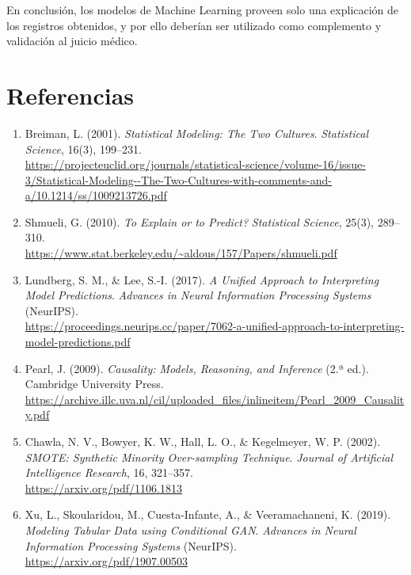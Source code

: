 \documentclass[11pt]{article}
\begin{document}
En conclusión, los modelos de Machine Learning proveen solo una explicación de los registros obtenidos, y por ello deberían ser utilizado como complemento y validación al juicio médico.
\clearpage

\section*{Referencias}
\sloppy
\begin{enumerate}

  \item Breiman, L. (2001). \textit{Statistical Modeling: The Two Cultures}. \textit{Statistical Science}, 16(3), 199--231.\\
  \url{https://projecteuclid.org/journals/statistical-science/volume-16/issue-3/Statistical-Modeling--The-Two-Cultures-with-comments-and-a/10.1214/ss/1009213726.pdf}

  \item Shmueli, G. (2010). \textit{To Explain or to Predict?} \textit{Statistical Science}, 25(3), 289--310.\\
  \url{https://www.stat.berkeley.edu/~aldous/157/Papers/shmueli.pdf}

  \item Lundberg, S. M., \& Lee, S.-I. (2017). \textit{A Unified Approach to Interpreting Model Predictions}. \textit{Advances in Neural Information Processing Systems} (NeurIPS).\\
  \url{https://proceedings.neurips.cc/paper/7062-a-unified-approach-to-interpreting-model-predictions.pdf}

  \item Pearl, J. (2009). \textit{Causality: Models, Reasoning, and Inference} (2.ª ed.). Cambridge University Press.\\
  \url{https://archive.illc.uva.nl/cil/uploaded_files/inlineitem/Pearl_2009_Causality.pdf}

  \item Chawla, N. V., Bowyer, K. W., Hall, L. O., \& Kegelmeyer, W. P. (2002). \textit{SMOTE: Synthetic Minority Over-sampling Technique}. \textit{Journal of Artificial Intelligence Research}, 16, 321--357.\\
  \url{https://arxiv.org/pdf/1106.1813}

  \item Xu, L., Skoularidou, M., Cuesta-Infante, A., \& Veeramachaneni, K. (2019). \textit{Modeling Tabular Data using Conditional GAN}. \textit{Advances in Neural Information Processing Systems} (NeurIPS).\\
  \url{https://arxiv.org/pdf/1907.00503}


\end{enumerate}
\end{document}
